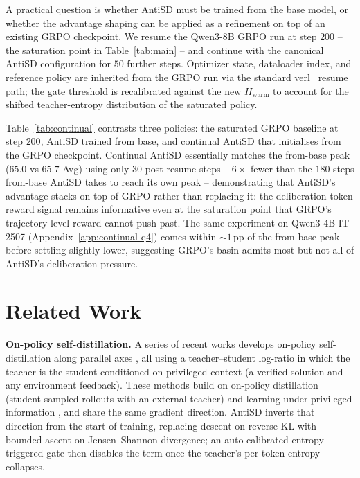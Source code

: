\documentclass{article}
\begin{document}
A practical question is whether AntiSD must be trained from the base model, or whether the advantage shaping can be applied as a refinement on top of an existing GRPO checkpoint. We resume the Qwen3-8B GRPO run at step $200$ -- the saturation point in Table~\ref{tab:main} -- and continue with the canonical AntiSD configuration for $50$ further steps. Optimizer state, dataloader index, and reference policy are inherited from the GRPO run via the standard verl~\citep{sheng2025hybridflow} resume path; the gate threshold is recalibrated against the new $H_{\mathrm{warm}}$ to account for the shifted teacher-entropy distribution of the saturated policy.



Table~\ref{tab:continual} contrasts three policies: the saturated GRPO baseline at step $200$, AntiSD trained from base, and continual AntiSD that initialises from the GRPO checkpoint. Continual AntiSD essentially matches the from-base peak ($65.0$ vs $65.7$ Avg) using only $30$ post-resume steps -- $6\times$ fewer than the $180$ steps from-base AntiSD takes to reach its own peak -- demonstrating that AntiSD's advantage stacks on top of GRPO rather than replacing it: the deliberation-token reward signal remains informative even at the saturation point that GRPO's trajectory-level reward cannot push past. The same experiment on Qwen3-4B-IT-2507 (Appendix~\ref{app:continual-q4}) comes within $\sim 1$\,pp of the from-base peak before settling slightly lower, suggesting GRPO's basin admits most but not all of AntiSD's deliberation pressure.

\vspace{-0.5em}

\section{Related Work}
\label{sec:related}
\vspace{-0.5em}

\textbf{On-policy self-distillation.}
A series of recent works develops on-policy self-distillation along parallel axes \citep{opsd, sdpo, opcd-ye, opsdc, yang2026rlsd}, all using a teacher--student log-ratio in which the teacher is the student conditioned on privileged context (a verified solution and any environment feedback). These methods build on on-policy distillation \citep{gkd, fu2026revisitingonpolicydistillationempirical} (student-sampled rollouts with an external teacher) and learning under privileged information \citep{vapnik-lupi, lopez2015unifying}, and share the same gradient direction. AntiSD inverts that direction from the start of training, replacing descent on reverse KL with bounded ascent on Jensen--Shannon divergence; an auto-calibrated entropy-triggered gate then disables the term once the teacher's per-token entropy collapses.
\end{document}
